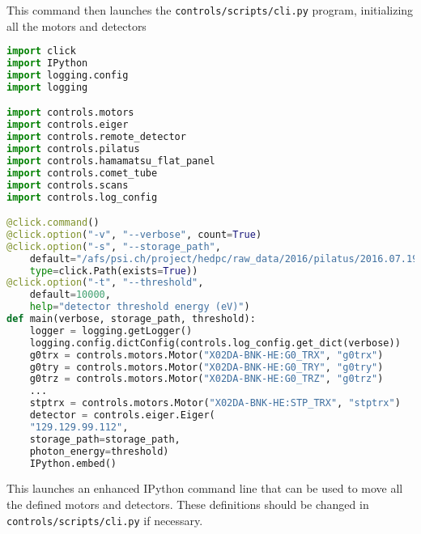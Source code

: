 This command then launches the \texttt{controls/scripts/cli.py} program,
initializing all the motors and detectors

\begin{lstlisting}[language=Python]
import click
import IPython
import logging.config
import logging

import controls.motors
import controls.eiger
import controls.remote_detector
import controls.pilatus
import controls.hamamatsu_flat_panel
import controls.comet_tube
import controls.scans
import controls.log_config

@click.command()
@click.option("-v", "--verbose", count=True)
@click.option("-s", "--storage_path",
    default="/afs/psi.ch/project/hedpc/raw_data/2016/pilatus/2016.07.19",
    type=click.Path(exists=True))
@click.option("-t", "--threshold",
    default=10000,
    help="detector threshold energy (eV)")
def main(verbose, storage_path, threshold):
    logger = logging.getLogger()
    logging.config.dictConfig(controls.log_config.get_dict(verbose))
    g0trx = controls.motors.Motor("X02DA-BNK-HE:G0_TRX", "g0trx")
    g0try = controls.motors.Motor("X02DA-BNK-HE:G0_TRY", "g0try")
    g0trz = controls.motors.Motor("X02DA-BNK-HE:G0_TRZ", "g0trz")
    ...
    stptrx = controls.motors.Motor("X02DA-BNK-HE:STP_TRX", "stptrx")
    detector = controls.eiger.Eiger(
    "129.129.99.112",
    storage_path=storage_path,
    photon_energy=threshold)
    IPython.embed()
\end{lstlisting}

This launches an enhanced IPython command line that can be used to move all
the defined motors and detectors. These definitions should be changed in
\texttt{controls/scripts/cli.py} if necessary.
